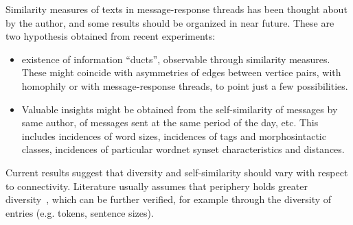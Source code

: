 Similarity measures of texts in message-response threads has been thought about by the author,
and some results should be organized in near future.
These are two hypothesis obtained from recent experiments:
\begin{itemize}
    \item existence of information ``ducts'', observable through similarity measures.
	    These might coincide with asymmetries of edges between vertice pairs,
		with homophily or with message-response threads, to point just a few possibilities.
    \item Valuable insights might be obtained from the self-similarity of messages by same author,
	    of messages sent at the same period of the day, etc.
	    This includes incidences of word sizes, incidences of tags and morphosintactic classes,
	    incidences of particular wordnet synset characteristics and distances.
\end{itemize}

Current results suggest that diversity and self-similarity should vary with respect to connectivity. 
Literature usually assumes that periphery holds greater diversity~\cite{easley},
which can be further verified, for example through the diversity of entries (e.g. tokens, sentence sizes).

